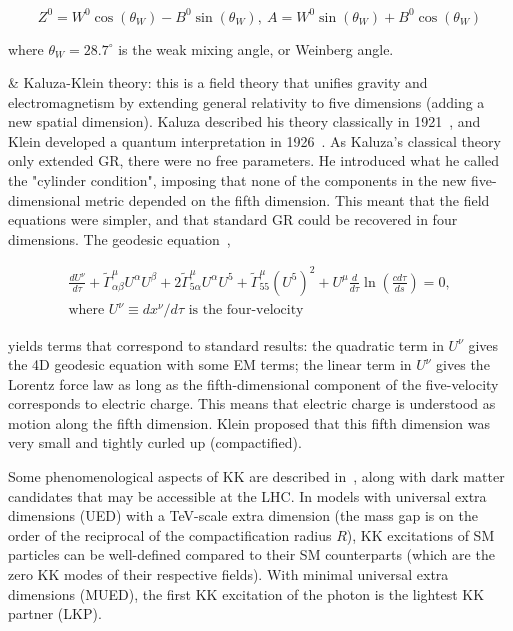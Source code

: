 \begin{easylist}[itemize]
\begin{equation}
Z^0 = W^0\cos(\theta_W) - B^0\sin(\theta_W), \ 
A = W^0\sin(\theta_W) + B^0\cos(\theta_W)
\end{equation}

where $\theta_W = 28.7^{\circ}$ is the weak mixing angle, or Weinberg angle.~\cite{tagkey1984quarksandleptons}

& Kaluza-Klein theory: this is a field theory that unifies gravity and electromagnetism by extending general relativity to five dimensions (adding a new spatial dimension). Kaluza described his theory classically in 1921~\cite{Kaluza1921}, and Klein developed a quantum interpretation in 1926~\cite{1926ZPhy37895K}. As Kaluza's classical theory only extended GR, there were no free parameters. He introduced what he called the "cylinder condition", imposing that none of the components in the new five-dimensional metric depended on the fifth dimension. This meant that the field equations were simpler, and that standard GR could be recovered in four dimensions. The geodesic equation~\cite{2012AstRv7b5W},

\begin{multline}
\frac{ dU^{\nu} }{ d\tau } + \tilde{\Gamma}^{\mu}_{\alpha\beta} U^{\alpha}U^{\beta} + 2 \tilde{\Gamma}^{\mu}_{5\alpha}U^{\alpha}U^5 + \tilde{\Gamma}^{\mu}_{55} (U^5)^2 + U^{\mu} \frac{ d }{ d\tau } \ln \left( \frac{ cd\tau }{ ds } \right) = 0, \\ \textrm{where $U^{\nu} \equiv dx^{\nu} / d\tau$ is the four-velocity}
\end{multline}

yields terms that correspond to standard results: the quadratic term in $U^{\nu}$ gives the 4D geodesic equation with some EM terms; the linear term in $U^{\nu}$ gives the Lorentz force law as long as the fifth-dimensional component of the five-velocity corresponds to electric charge. This means that electric charge is understood as motion along the fifth dimension. Klein proposed that this fifth dimension was very small and tightly curled up (compactified).

Some phenomenological aspects of KK are described in~\cite{Flacke:2017xsv}, along with dark matter candidates that may be accessible at the LHC. In models with universal extra dimensions (UED) with a TeV-scale extra dimension (the mass gap is on the order of the reciprocal of the compactification radius $R$), KK excitations of SM particles can be well-defined compared to their SM counterparts (which are the zero KK modes of their respective fields). With minimal universal extra dimensions (MUED), the first KK excitation of the photon is the lightest KK partner (LKP).


\end{easylist}
